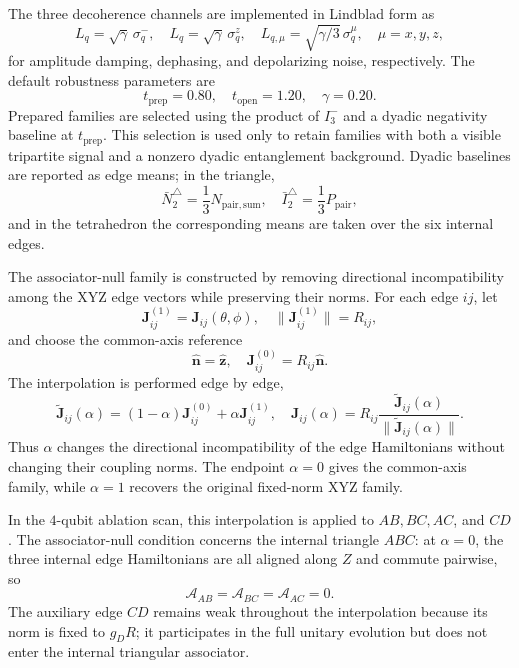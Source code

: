 \documentclass[aps,physrev,preprint,groupedaddress]{revtex4-2}
\begin{document}
The three decoherence channels are implemented in Lindblad form as
\begin{equation}
    L_q=\sqrt{\gamma}\,\sigma_q^-, \quad L_q=\sqrt{\gamma}\,\sigma_q^z, \quad
    L_{q,\mu}=\sqrt{\gamma/3}\,\sigma_q^\mu,\quad \mu=x,y,z,
\end{equation}
for amplitude damping, dephasing, and depolarizing noise, respectively. The default robustness parameters are
\begin{equation}
    t_{\mathrm{prep}}=0.80,\quad t_{\mathrm{open}}=1.20,\quad \gamma=0.20 .
\end{equation}
Prepared families are selected using the product of $I_3^-$ and a dyadic negativity baseline at $t_{\mathrm{prep}}$. This selection is used only to retain families with both a visible tripartite signal and a nonzero dyadic entanglement background. Dyadic baselines are reported as edge means; in the triangle,
\begin{equation}
    \bar N_2^{\triangle} = \frac{1}{3} N_{\mathrm{pair,sum}},
    \quad \bar I_2^{\triangle} = \frac{1}{3} P_{\mathrm{pair}},
\end{equation}
and in the tetrahedron the corresponding means are taken over the six internal edges.

The associator-null family is constructed by removing directional incompatibility among the XYZ edge vectors while preserving their norms. For each edge $ij$, let
\begin{equation}
    \mathbf{J}_{ij}^{(1)} = \mathbf{J}_{ij}(\theta,\phi), \quad
    \lVert\mathbf J_{ij}^{(1)}\rVert=R_{ij},
\end{equation}
and choose the common-axis reference
\begin{equation}
    \hat{\mathbf{n}}=\hat{\mathbf{z}}, \quad \mathbf{J}_{ij}^{(0)}=R_{ij}\hat{\mathbf{n}}.
\end{equation}
The interpolation is performed edge by edge,
\begin{equation}
    \tilde{\mathbf J}_{ij}(\alpha) = (1-\alpha)\mathbf{J}_{ij}^{(0)} + \alpha\mathbf{J}_{ij}^{(1)},
    \quad \mathbf J_{ij}(\alpha) = R_{ij}\frac{\tilde{\mathbf J}_{ij}(\alpha)}{\lVert\tilde{\mathbf J}_{ij}(\alpha)\rVert} .
\end{equation}
Thus $\alpha$ changes the directional incompatibility of the edge Hamiltonians without changing their coupling norms. The endpoint $\alpha=0$ gives the common-axis family, while $\alpha=1$ recovers the original fixed-norm XYZ family.

In the $4$-qubit ablation scan, this interpolation is applied to $AB,BC,AC$, and $CD$. The associator-null condition concerns the internal triangle $ABC$: at $\alpha=0$, the three internal edge Hamiltonians are all aligned along $Z$ and commute pairwise, so
\begin{equation}
    \mathcal{A}_{AB}=\mathcal{A}_{BC}=\mathcal{A}_{AC}=0.
\end{equation}
The auxiliary edge $CD$ remains weak throughout the interpolation because its norm is fixed to $g_D R$; it participates in the full unitary evolution but does not enter the internal triangular associator.
\end{document}
